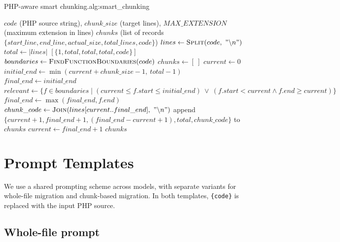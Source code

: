 \begin{appalgorithm}{PHP-aware smart chunking.}{alg:smart_chunking}
\begin{algorithmic}[1]
\Require $code$ (PHP source string), $chunk\_size$ (target lines), $MAX\_EXTENSION$ (maximum extension in lines)
\Ensure $chunks$ (list of records $\{start\_line, end\_line, actual\_size, total\_lines, code\}$)
\State $lines \gets \Call{Split}{code,\ "\backslash n"}$
\State $total \gets |lines|$
  \State \Return $[\{1, total, total, total, code\}]$
\EndIf
\State $boundaries \gets \Call{FindFunctionBoundaries}{code}$
\State $chunks \gets [\ ]$
\State $current \gets 0$
  \State $initial\_end \gets \min(current + chunk\_size - 1,\ total - 1)$
  \State $final\_end \gets initial\_end$
  \State $relevant \gets \{f \in boundaries \mid (current \le f.start \le initial\_end)\ \lor\ (f.start < current \land f.end \ge current)\}$
      \State $final\_end \gets \max(final\_end, f.end)$
    \EndIf
  \EndFor
  \State $chunk\_code \gets \Call{Join}{lines[current..final\_end],\ "\backslash n"}$
  \State append $\{current+1, final\_end+1, (final\_end-current+1), total, chunk\_code\}$ to $chunks$
  \State $current \gets final\_end + 1$
\EndWhile
\State \Return $chunks$
\end{algorithmic}
\end{appalgorithm}

\section{Prompt Templates}
\label{app:prompt_templates}

We use a shared prompting scheme across models, with separate variants for whole-file migration and chunk-based migration.
In both templates, \texttt{\{code\}} is replaced with the input PHP source.

\subsection{Whole-file prompt}

